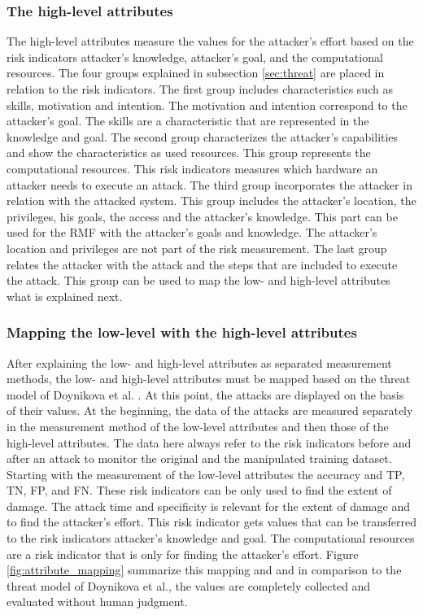 \subsubsection*{The high-level attributes}

The high-level attributes measure the values for the attacker's effort based on the risk indicators attacker's knowledge, attacker's goal, and the computational resources. The four groups explained in subsection \ref{sec:threat} are placed in relation to the risk indicators. The first group includes characteristics such as skills, motivation and intention. The motivation and intention correspond to the attacker's goal. The skills are a characteristic that are represented in the knowledge and goal. The second group characterizes the attacker's capabilities \cite{DBLP:journals/iet-cdt/XueGLYO20} and show the characteristics as used resources. This group represents the computational resources. This risk indicators measures which hardware an attacker needs to execute an attack. The third group incorporates the attacker in relation with the attacked system. This group includes the attacker's location, the privileges, his goals, the access and the attacker's knowledge. This part can be used for the RMF with the attacker's goals and knowledge. The attacker's location and privileges are not part of the risk measurement. The last group relates the attacker with the attack and the steps that are included to execute the attack. This group can be used to map the low- and high-level attributes what is explained next.

\subsubsection*{Mapping the low-level with the high-level attributes}
\label{sec:map_low_high}

After explaining the low- and high-level attributes as separated measurement methods, the low- and high-level attributes must be mapped based on the threat model of Doynikova et al. \cite{DBLP:conf/crisis/DoynikovaNGK20}. At this point, the attacks are displayed on the basis of their values. At the beginning, the data of the attacks are measured separately in the measurement method of the low-level attributes and then those of the high-level attributes. The data here always refer to the risk indicators before and after an attack to monitor the original and the manipulated training dataset. Starting with the measurement of the low-level attributes the accuracy and TP, TN, FP, and FN. These risk indicators can be only used to find the extent of damage. The attack time and specificity is relevant for the extent of damage and to find the attacker's effort. This risk indicator gets values that can be transferred to the risk indicators attacker's knowledge and goal. The computational resources are a risk indicator that is only for finding the attacker's effort. Figure \ref{fig:attribute_mapping} summarize this mapping and and in comparison to the threat model of Doynikova et al., the values are completely collected and evaluated without human judgment.

